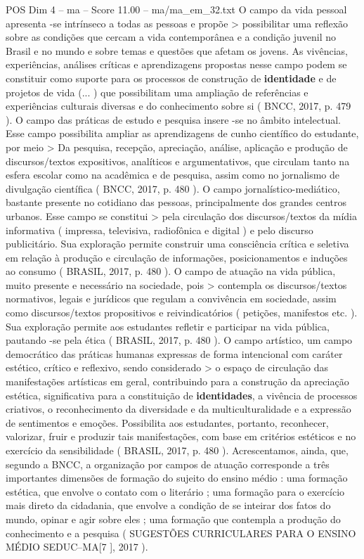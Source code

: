 \begin{textsample}{POS Dim 4 – ma – Score 11.00 – ma/ma\_em\_32.txt}
O campo da vida pessoal apresenta -se intrínseco a todas as pessoas e propõe > possibilitar uma reflexão sobre as condições que cercam a vida contemporânea e a condição juvenil no Brasil e no mundo e sobre temas e questões que afetam os jovens.
As vivências, experiências, análises críticas e aprendizagens propostas nesse campo podem se constituir como suporte para os processos de construção de \textbf{identidade} e de projetos de vida (... ) que possibilitam uma ampliação de referências e experiências culturais diversas e do conhecimento sobre si ( BNCC, 2017, p. 479 ).
O campo das práticas de estudo e pesquisa insere -se no âmbito intelectual.
Esse campo possibilita ampliar as aprendizagens de cunho científico do estudante, por meio > Da pesquisa, recepção, apreciação, análise, aplicação e produção de discursos/textos expositivos, analíticos e argumentativos, que circulam tanto na esfera escolar como na acadêmica e de pesquisa, assim como no jornalismo de divulgação científica ( BNCC, 2017, p. 480 ).
O campo jornalístico-mediático, bastante presente no cotidiano das pessoas, principalmente dos grandes centros urbanos.
Esse campo se constitui > pela circulação dos discursos/textos da mídia informativa ( impressa, televisiva, radiofônica e digital ) e pelo discurso publicitário.
Sua exploração permite construir uma consciência crítica e seletiva em relação à produção e circulação de informações, posicionamentos e induções ao consumo ( BRASIL, 2017, p. 480 ).
O campo de atuação na vida pública, muito presente e necessário na sociedade, pois > contempla os discursos/textos normativos, legais e jurídicos que regulam a convivência em sociedade, assim como discursos/textos propositivos e reivindicatórios ( petições, manifestos etc. ).
Sua exploração permite aos estudantes refletir e participar na vida pública, pautando -se pela ética ( BRASIL, 2017, p. 480 ).
O campo artístico, um campo democrático das práticas humanas expressas de forma intencional com caráter estético, crítico e reflexivo, sendo considerado > o espaço de circulação das manifestações artísticas em geral, contribuindo para a construção da apreciação estética, significativa para a constituição de \textbf{identidades}, a vivência de processos criativos, o reconhecimento da diversidade e da multiculturalidade e a expressão de sentimentos e emoções.
Possibilita aos estudantes, portanto, reconhecer, valorizar, fruir e produzir tais manifestações, com base em critérios estéticos e no exercício da sensibilidade ( BRASIL, 2017, p. 480 ).
Acrescentamos, ainda, que, segundo a BNCC, a organização por campos de atuação corresponde a três importantes dimensões de formação do sujeito do ensino médio : uma formação estética, que envolve o contato com o literário ; uma formação para o exercício mais direto da cidadania, que envolve a condição de se inteirar dos fatos do mundo, opinar e agir sobre eles ; uma formação que contempla a produção do conhecimento e a pesquisa ( SUGESTÕES CURRICULARES PARA O ENSINO MÉDIO SEDUC–MA[7 ], 2017 ).

\end{textsample}
